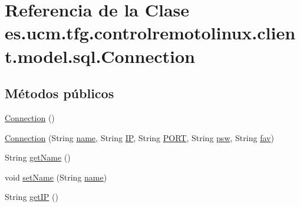 \hypertarget{classes_1_1ucm_1_1tfg_1_1controlremotolinux_1_1client_1_1model_1_1sql_1_1Connection}{\section{Referencia de la Clase es.\-ucm.\-tfg.\-controlremotolinux.\-client.\-model.\-sql.\-Connection}
\label{classes_1_1ucm_1_1tfg_1_1controlremotolinux_1_1client_1_1model_1_1sql_1_1Connection}
}
\subsection*{Métodos públicos}
\begin{DoxyCompactItemize}
\item 
\hyperlink{classes_1_1ucm_1_1tfg_1_1controlremotolinux_1_1client_1_1model_1_1sql_1_1Connection_ad61c86b4f567b05a2968e10881f93991}{Connection} ()
\item 
\hyperlink{classes_1_1ucm_1_1tfg_1_1controlremotolinux_1_1client_1_1model_1_1sql_1_1Connection_afdccaca29a9061f41114d6944feca2be}{Connection} (String \hyperlink{classes_1_1ucm_1_1tfg_1_1controlremotolinux_1_1client_1_1model_1_1sql_1_1Connection_a08e64027f2b9152da0f574100143b061}{name}, String \hyperlink{classes_1_1ucm_1_1tfg_1_1controlremotolinux_1_1client_1_1model_1_1sql_1_1Connection_acbd1f3f267574d1ec6d4a657c0f4fc59}{I\-P}, String \hyperlink{classes_1_1ucm_1_1tfg_1_1controlremotolinux_1_1client_1_1model_1_1sql_1_1Connection_a8353d2279c18f5d32e4c0b1962c86bd7}{P\-O\-R\-T}, String \hyperlink{classes_1_1ucm_1_1tfg_1_1controlremotolinux_1_1client_1_1model_1_1sql_1_1Connection_aa4ddf94e321302e538523e1ab50e8ed1}{psw}, String \hyperlink{classes_1_1ucm_1_1tfg_1_1controlremotolinux_1_1client_1_1model_1_1sql_1_1Connection_adc14616b9eccc05f03c5a677b01b8ae1}{fav})
\item 
String \hyperlink{classes_1_1ucm_1_1tfg_1_1controlremotolinux_1_1client_1_1model_1_1sql_1_1Connection_a6694bb1be6d9d9b2778345efe560b66b}{get\-Name} ()
\item 
void \hyperlink{classes_1_1ucm_1_1tfg_1_1controlremotolinux_1_1client_1_1model_1_1sql_1_1Connection_a9d5fcb33c0f99c39dbe8928472d50026}{set\-Name} (String \hyperlink{classes_1_1ucm_1_1tfg_1_1controlremotolinux_1_1client_1_1model_1_1sql_1_1Connection_a08e64027f2b9152da0f574100143b061}{name})
\item 
String \hyperlink{classes_1_1ucm_1_1tfg_1_1controlremotolinux_1_1client_1_1model_1_1sql_1_1Connection_a031c3070c774bdb3c70980ebf2ffbf81}{get\-I\-P} ()

\end{DoxyCompactItemize}
